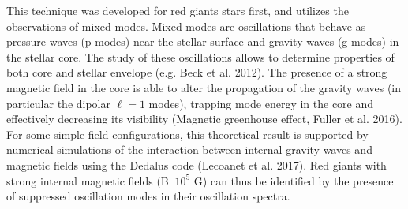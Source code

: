 This technique was developed for red giants stars first, and utilizes the observations of mixed modes. Mixed modes are
oscillations that behave as pressure waves (p-modes) near the stellar surface and gravity waves (g-modes) in the stellar core.
The study of these oscillations allows to determine properties of both core and stellar envelope (e.g. Beck et al. 2012).
The presence of a strong magnetic field in the core is able to alter the propagation of the gravity waves (in particular the dipolar $\ell =1$ modes),
trapping mode energy in the core and effectively decreasing its visibility (Magnetic greenhouse effect, Fuller et al. 2016).
For some simple field configurations, this theoretical result is supported  by numerical simulations of the interaction between
internal gravity waves and magnetic fields using the Dedalus code (Lecoanet et al. 2017).
Red giants with strong internal magnetic fields (B $\ 10^5$ G) can thus be identified by the presence of suppressed oscillation modes in their oscillation spectra.
